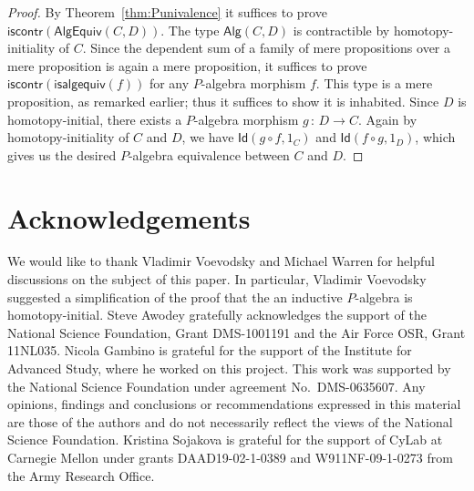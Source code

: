 \documentclass[10pt,a4paper,oneside,reqno]{amsart}
\numberwithin{equation}{section}
\theoremstyle{mythm}
\theoremstyle{mydef}
\theoremstyle{myrmk}
\newcommand{\co}{\,{:}\,}
\newcommand{\iscontr}{\mathsf{iscontr}}
\newcommand{\Id}{\mathsf{Id}}
\newcommand{\Palg}{\mathsf{Alg}}
\newcommand{\isalgequiv}{\mathsf{isalgequiv}}
\newcommand{\AlgEquiv}{\mathsf{AlgEquiv}}
\begin{document}
\begin{proof}
By Theorem~\ref{thm:Punivalence} it suffices to prove $\iscontr(\AlgEquiv(C,D))$. The type $\Palg(C,D)$ is contractible by homotopy-initiality of $C$. Since the dependent sum of a family of mere propositions over a mere proposition is again a mere proposition, it suffices to prove $\iscontr(\isalgequiv(f))$ for any $P$-algebra morphism $f$. This type is a mere proposition, as remarked earlier; thus it suffices to show it is inhabited.
Since $D$ is homotopy-initial, there exists a $P$-algebra morphism $g \co D \to C$. Again by homotopy-initiality of $C$ and 
$D$, we have $\Id(g \circ f, 1_C)$ and $\Id(f \circ g, 1_D)$, which gives us the desired $P$-algebra equivalence between 
$C$ and $D$.
\end{proof}



\section*{Acknowledgements}

We would like to thank Vladimir Voevodsky and Michael Warren for helpful discussions
on the subject of this paper. In particular, Vladimir Voevodsky suggested a simplification of the 
proof that the an inductive $P$-algebra is homotopy-initial.
 Steve Awodey gratefully acknowledges the support of the National Science Foundation, Grant DMS-1001191 and the Air Force OSR, Grant 11NL035. Nicola Gambino is grateful for the support of the Institute for Advanced Study, where
he worked on this project. This work was supported by the National Science Foundation 
under agreement No.\ DMS-0635607. Any opinions, findings and conclusions or recommendations
expressed in this material are those of the authors and do not necessarily reflect the views of
the National Science Foundation. Kristina Sojakova is grateful for the support of CyLab at Carnegie
Mellon under grants DAAD19-02-1-0389 and W911NF-09-1-0273 from the Army
Research Office.











                        
\end{document}

